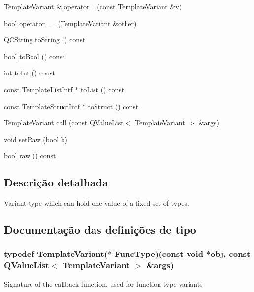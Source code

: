 \begin{DoxyCompactItemize}
\item 
\hyperlink{class_template_variant}{Template\-Variant} \& \hyperlink{class_template_variant_a72b2525e8ce5b85ede8bef2f0d889fcf}{operator=} (const \hyperlink{class_template_variant}{Template\-Variant} \&v)
\item 
bool \hyperlink{class_template_variant_a41a8e28d2069e240b4d2f9b73e838d3b}{operator==} (\hyperlink{class_template_variant}{Template\-Variant} \&other)
\item 
\hyperlink{class_q_c_string}{Q\-C\-String} \hyperlink{class_template_variant_accfeb508e965628127257559e6f9955d}{to\-String} () const 
\item 
bool \hyperlink{class_template_variant_a15274045457dcf54a03e7b417c9e7644}{to\-Bool} () const 
\item 
int \hyperlink{class_template_variant_af7a5586bcba0f228f5acb3b37ebae263}{to\-Int} () const 
\item 
const \hyperlink{class_template_list_intf}{Template\-List\-Intf} $\ast$ \hyperlink{class_template_variant_ab78575b27a0da8303fb30a94a7280cd7}{to\-List} () const 
\item 
const \hyperlink{class_template_struct_intf}{Template\-Struct\-Intf} $\ast$ \hyperlink{class_template_variant_ae6b58194c3b9f77e1e54c92f789de3b5}{to\-Struct} () const 
\item 
\hyperlink{class_template_variant}{Template\-Variant} \hyperlink{class_template_variant_a6a8a4d621c1a0b518b527fc5f55d6e22}{call} (const \hyperlink{class_q_value_list}{Q\-Value\-List}$<$ \hyperlink{class_template_variant}{Template\-Variant} $>$ \&args)
\item 
void \hyperlink{class_template_variant_a61170e4e5480a6d487eb7bd4babbe2b1}{set\-Raw} (bool b)
\item 
bool \hyperlink{class_template_variant_a4b1f81e659f9eb2d4964f1b3e55a32bb}{raw} () const 
\end{DoxyCompactItemize}


\subsection{Descrição detalhada}
Variant type which can hold one value of a fixed set of types. 

\subsection{Documentação das definições de tipo}
\hypertarget{class_template_variant_a9048747cd5dd98f5d42a53664324f7e4}{
\subsubsection[{Func\-Type}]{\setlength{\rightskip}{0pt plus 5cm}typedef {\bf Template\-Variant}($\ast$ Func\-Type)(const void $\ast$obj, const {\bf Q\-Value\-List}$<$ {\bf Template\-Variant} $>$ \&args)}}\label{class_template_variant_a9048747cd5dd98f5d42a53664324f7e4}
Signature of the callback function, used for function type variants 

